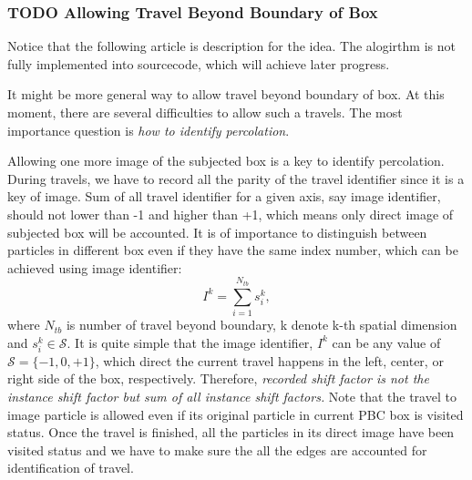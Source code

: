 \documentclass[10pt, a4paper]{article}
\begin{document}
\begin{appendices}
\subsubsection{{\bfseries\sffamily TODO} Allowing Travel Beyond Boundary of Box}
\label{sec:orgheadline10}
Notice that the following article is description for the idea. The alogirthm is not fully implemented into sourcecode, which will achieve later progress.

It might be more general way to allow travel beyond boundary of box. At this moment, there are several difficulties to allow such a travels. The most importance question is \emph{how to identify percolation}.

Allowing one more image of the subjected box is a key to identify percolation. During travels, we have to record all the parity of the travel identifier since it is a key of image. Sum of all travel identifier for a given axis, say image identifier, should not lower than -1 and higher than +1, which means only direct image of subjected box will be accounted. It is of importance to distinguish between particles in different box even if they have the same index number, which can be achieved using image identifier:
\begin{equation}
I^{k} = \sum_{i=1}^{N_{tb}} s^{k}_i,
\end{equation}
where \(N_{tb}\) is number of travel beyond boundary, k denote k-th spatial dimension and \(s^k_i \in \mathscr{S}\). It is quite simple that the image identifier, \(I^{k}\) can be any value of \(\mathscr{S}=\{-1, 0, +1\}\), which direct the current travel happens in the left, center, or right side of the box, respectively. Therefore, \emph{recorded shift factor is not the instance shift factor but sum of all instance shift factors.} Note that the travel to image particle is allowed even if its original particle in current PBC box is visited status. Once the travel is finished, all the particles in its direct image have been visited status and we have to make sure the all the edges are accounted for identification of travel. 


\end{appendices}
\end{document}
